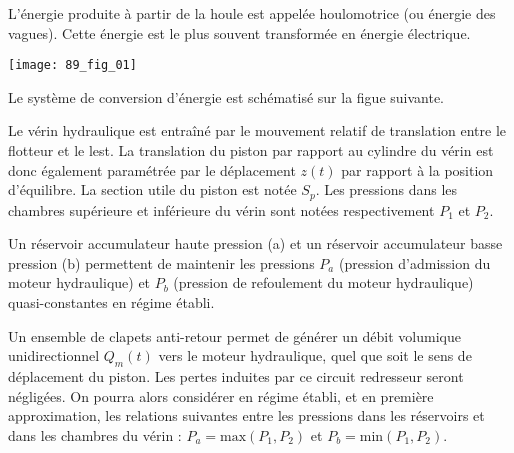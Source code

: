 \normaltrue \difficilefalse \tdifficilefalse
\correctionfalse

\setcounter{question}{0}

\ifcorrection
\else
{}
\fi



\ifprof
\else
L’énergie produite à partir de la houle est appelée houlomotrice (ou énergie des vagues). Cette énergie est le plus souvent
transformée en énergie électrique.

\begin{marginfigure}
\texttt{[image: 89\_fig\_01]}
\end{marginfigure}

Le système de conversion d'énergie est schématisé sur la figue suivante.

Le vérin hydraulique est entraîné par le mouvement relatif de translation entre le flotteur et le lest.
La translation du piston par rapport au cylindre du vérin est donc également paramétrée par le
déplacement $z(t)$ par rapport à la position d’équilibre. La section utile du piston est notée $S_p$. Les
pressions dans les chambres supérieure et inférieure du vérin sont notées respectivement $P_1$ et $P_2$.

Un réservoir accumulateur haute pression (a) et un réservoir accumulateur basse pression (b)
permettent de maintenir les pressions $P_a$ (pression d'admission du moteur hydraulique) et $P_b$
(pression de refoulement du moteur hydraulique) quasi-constantes en régime établi.

Un ensemble de clapets anti-retour permet de générer un débit volumique unidirectionnel $Q_m(t)$
vers le moteur hydraulique, quel que soit le sens de déplacement du piston. Les pertes induites par
ce circuit redresseur seront négligées. On pourra alors considérer en régime établi, et en première
approximation, les relations suivantes entre les pressions dans les réservoirs et dans les chambres du
vérin : $P_a = \text{max} \left(P_1,P_2\right)$ et $P_b = \text{min} \left(P_1,P_2\right)$.

\fi


